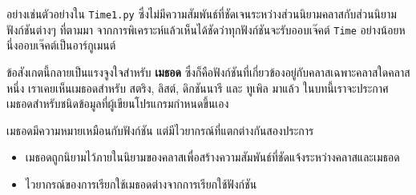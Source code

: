 อย่างเช่นตัวอย่างใน {\tt Time1.py} ซึ่งไม่มีความสัมพันธ์ที่ชัดเจนระหว่างส่วนนิยามคลาสกับส่วนนิยามฟังก์ชันต่างๆ ที่ตามมา 
จากการพิเคราะห์แล้วเห็นได้ชัดว่าทุกฟังก์ชันจะรับออบเจ๊คต์ {\tt Time} อย่างน้อยหนึ่งออบเจ๊คต์เป็นอาร์กูเมนต์ 


ข้อสังเกตนี้กลายเป็นแรงจูงใจสำหรับ {\bf เมธอด} ซึ่งก็คือฟังก์ชันที่เกี่ยวข้องอยู่กับคลาสเฉพาะคลาสใดคลาสหนึ่ง 
เราเคยเห็นเมธอดสำหรับ สตริง, ลิสต์, ดิกชันนารี และ ทูเพิล มาแล้ว ในบทนี้เราจะประกาศเมธอดสำหรับชนิดข้อมูลที่ผู้เขียนโปรแกรมกำหนดขึ้นเอง

เมธอดมีความหมายเหมือนกับฟังก์ชัน แต่มีไวยากรณ์ที่แตกต่างกันสองประการ

\begin{itemize}


\item เมธอดถูกนิยามไว้ภายในนิยามของคลาสเพื่อสร้างความสัมพันธ์ที่ชัดแจ้งระหว่างคลาสและเมธอด


\item  ไวยากรณ์ของการเรียกใช้เมธอดต่างจากการเรียกใช้ฟังก์ชัน

\end{itemize}


